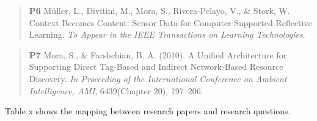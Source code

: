 \begin{quote}
\textbf{P6} Müller, L., Divitini, M., Mora, S., Rivera-Pelayo, V., \&
Stork, W. Context Becomes Content: Sensor Data for Computer Supported
Reflective Learning. \emph{To Appear in the IEEE Transactions on
Learning Technologies}.
\end{quote}

\begin{quote}
\textbf{P7} Mora, S., \& Farshchian, B. A. (2010). A Unified
Architecture for Supporting Direct Tag-Based and Indirect Network-Based
Resource Discovery. \emph{In Proceeding of the International Conference
on Ambient Intelligence, AMI}, 6439(Chapter 20), 197--206.
\end{quote}

Table x shows the mapping between research papers and research
questions.

